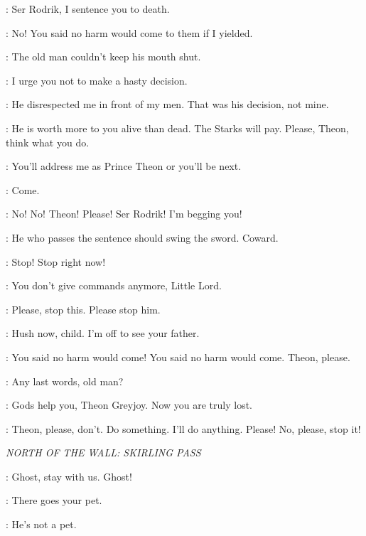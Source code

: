\THEON: Ser Rodrik, I sentence you to death. 

\BRAN: No! You said no harm would come to them if I yielded. 

\THEON: The old man couldn't keep his mouth shut. 

\LUWIN: I urge you not to make a hasty decision. 

\THEON: He disrespected me in front of my men. That was his decision, not mine. 

\LUWIN: He is worth more to you alive than dead. The Starks will pay. Please, Theon, think what you do. 

\THEON:  You'll address me as Prince Theon or you'll be next. 

\DAGMER: Come. 


\BRAN: No! No! Theon! Please! Ser Rodrik! I'm begging you!


\RODRIK: He who passes the sentence should swing the sword. Coward. 


\BRAN: Stop! Stop right now! 

\THEON: You don't give commands anymore, Little Lord. 

\BRAN: Please, stop this. Please stop him. 

\RODRIK: Hush now, child. I'm off to see your father. 

\BRAN: You said no harm would come! You said no harm would come. Theon, please. 

\THEON: Any last words, old man? 

\RODRIK: Gods help you, Theon Greyjoy. Now you are truly lost. 

\BRAN: Theon, please, don't. Do something. I'll do anything. Please! No, please, stop it! 



\scene

\textit{NORTH OF THE WALL: SKIRLING PASS}


\JON: Ghost, stay with us. Ghost! 

\HALFHAND: There goes your pet. 

\JON: He's not a pet. 

